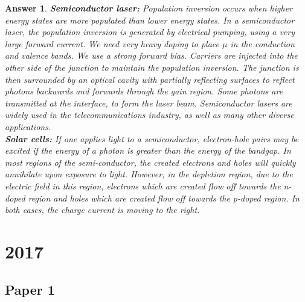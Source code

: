 \documentclass[a4paper]{article}
\newtheorem{ans}{Answer}[subsection]
\theoremstyle{new}
\begin{document}
\begin{ans}
\textbf{Semiconductor laser:} Population inversion occurs when higher energy states are more populated than lower energy states. In a semiconductor laser, the population inversion is generated by electrical pumping, using a very large forward current. We need very heavy doping to place $\mu$ in the conduction and valence bands. We use a strong forward bias. Carriers are injected into the other side of the junction to maintain the population inversion. The junction is then surrounded by an optical cavity with partially reflecting surfaces to reflect photons backwards and forwards through the gain region. Some photons are transmitted at the interface, to form the laser beam. Semiconductor lasers are widely used in the telecommunications industry, as well as many other diverse applications.\\[5pt]
\textbf{Solar cells:} If one applies light to a semiconductor, electron-hole pairs may be excited if the energy of a photon is greater than the energy of the bandgap. In most regions of the semi-conductor, the created electrons and holes will quickly annihilate upon exposure to light. However, in the depletion region, due to the electric field in this region, electrons which are created flow off towards the n-doped region and holes which are created flow off towards the p-doped region. In both cases, the charge current is moving to the right.
\end{ans}
\newpage
\newpage
\section{2017}
\subsection{Paper 1}
\end{document}
